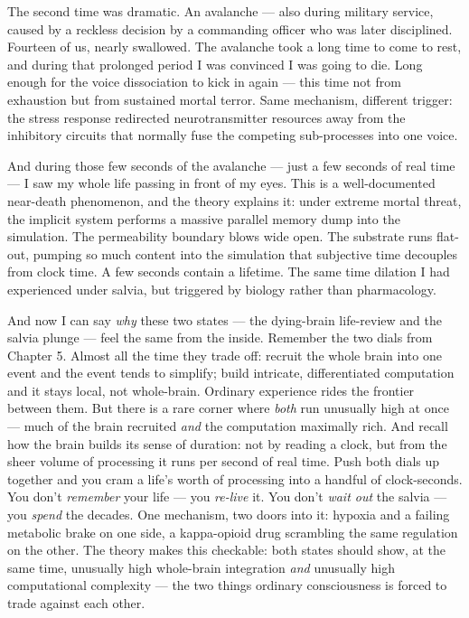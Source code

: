 \documentclass[11pt, twoside, openright]{book}
\begin{document}
The second time was dramatic. An avalanche --- also during military service, caused by a reckless decision by a commanding officer who was later disciplined. Fourteen of us, nearly swallowed. The avalanche took a long time to come to rest, and during that prolonged period I was convinced I was going to die. Long enough for the voice dissociation to kick in again --- this time not from exhaustion but from sustained mortal terror. Same mechanism, different trigger: the stress response redirected neurotransmitter resources away from the inhibitory circuits that normally fuse the competing sub-processes into one voice.

And during those few seconds of the avalanche --- just a few seconds of real time --- I saw my whole life passing in front of my eyes. This is a well-documented near-death phenomenon, and the theory explains it: under extreme mortal threat, the implicit system performs a massive parallel memory dump into the simulation. The permeability boundary blows wide open. The substrate runs flat-out, pumping so much content into the simulation that subjective time decouples from clock time. A few seconds contain a lifetime. The same time dilation I had experienced under salvia, but triggered by biology rather than pharmacology.

And now I can say \textit{why} these two states --- the dying-brain life-review and the salvia plunge --- feel the same from the inside. Remember the two dials from Chapter 5. Almost all the time they trade off: recruit the whole brain into one event and the event tends to simplify; build intricate, differentiated computation and it stays local, not whole-brain. Ordinary experience rides the frontier between them. But there is a rare corner where \textit{both} run unusually high at once --- much of the brain recruited \textit{and} the computation maximally rich. And recall how the brain builds its sense of duration: not by reading a clock, but from the sheer volume of processing it runs per second of real time. Push both dials up together and you cram a life's worth of processing into a handful of clock-seconds. You don't \textit{remember} your life --- you \textit{re-live} it. You don't \textit{wait out} the salvia --- you \textit{spend} the decades. One mechanism, two doors into it: hypoxia and a failing metabolic brake on one side, a kappa-opioid drug scrambling the same regulation on the other. The theory makes this checkable: both states should show, at the same time, unusually high whole-brain integration \textit{and} unusually high computational complexity --- the two things ordinary consciousness is forced to trade against each other.
\end{document}
